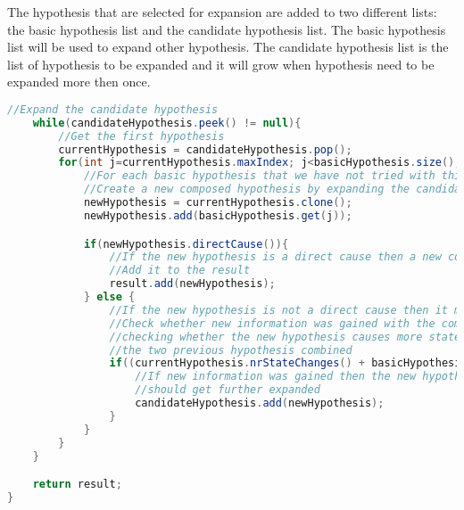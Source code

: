 The hypothesis that are selected for expansion are added to two different lists: the basic hypothesis list and the candidate hypothesis list. The basic hypothesis list will be used to expand other hypothesis. The candidate hypothesis list is the list of hypothesis to be expanded and it will grow when  hypothesis need to be expanded more then once.

\begin{lstlisting}[language=Java]
    //Expand the candidate hypothesis
    while(candidateHypothesis.peek() != null){
        //Get the first hypothesis
        currentHypothesis = candidateHypothesis.pop();
        for(int j=currentHypothesis.maxIndex; j<basicHypothesis.size(); j++){
            //For each basic hypothesis that we have not tried with this combination
            //Create a new composed hypothesis by expanding the candidate with the basic hypothesis
            newHypothesis = currentHypothesis.clone();
            newHypothesis.add(basicHypothesis.get(j));

            if(newHypothesis.directCause()){
                //If the new hypothesis is a direct cause then a new composed hypothesis has been found
                //Add it to the result
                result.add(newHypothesis);
            } else {
                //If the new hypothesis is not a direct cause then it might need further expanding.
                //Check whether new information was gained with the composed hypothesis by
                //checking whether the new hypothesis causes more state changes then
                //the two previous hypothesis combined
                if((currentHypothesis.nrStateChanges() + basicHypothesis.get(j).nrStateChanges() < newHypothesis.nrStateChanges())){
                    //If new information was gained then the new hypothesis
                    //should get further expanded
                    candidateHypothesis.add(newHypothesis);
                }
            }
        }
    }

    return result;
}
\end{lstlisting}
